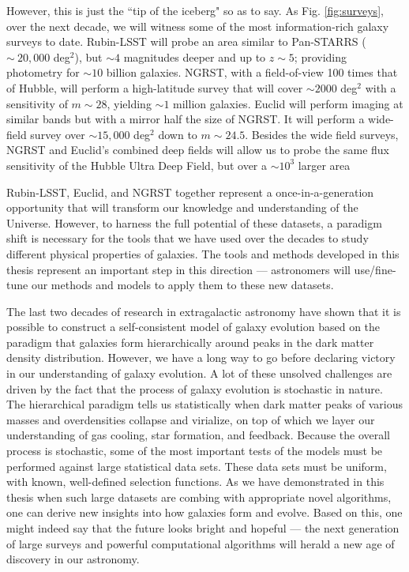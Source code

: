However, this is just the ``tip of the iceberg" so as to say. As Fig. \ref{fig:surveys}, over the next decade, we will witness some of the most information-rich galaxy surveys to date. Rubin-LSST will probe an area similar to Pan-STARRS ($\sim~20,000$ deg$^2$), but $\sim4$ magnitudes deeper and up to $z\sim5$; providing photometry for $\sim10$ billion galaxies. NGRST, with a field-of-view 100 times that of Hubble, will perform a high-latitude survey that will cover $\sim2000$ deg$^2$ with a sensitivity of $m\sim28$, yielding $\sim1$ million galaxies. Euclid will perform imaging at similar bands but with a mirror half the size of NGRST. It will perform a wide-field survey over $\sim15,000$ deg$^2$ down to $m\sim24.5$. Besides the wide field surveys, NGRST and Euclid’s combined deep fields will allow us to probe the same flux sensitivity of the Hubble Ultra Deep Field, but over a $\sim10^3$ larger area 

Rubin-LSST, Euclid, and NGRST together represent a once-in-a-generation opportunity that will transform our knowledge and understanding of the Universe. However, to harness the full potential of these datasets, a paradigm shift is necessary for the tools that we have used over the decades to study different physical properties of galaxies. The tools and methods developed in this thesis represent an important step in this direction --- astronomers will use/fine-tune our methods and models to apply them to these new datasets. 

 The last two decades of research in extragalactic astronomy have shown that it is possible to construct a self-consistent model of galaxy evolution based on the paradigm that galaxies form hierarchically around peaks in the dark matter density distribution. However, we have a long way to go before declaring victory in our understanding of galaxy evolution. A lot of these unsolved challenges are driven by the fact that the process of galaxy evolution is stochastic in nature. The hierarchical paradigm tells us statistically when dark matter peaks of various masses and overdensities collapse and virialize, on top of which we layer our understanding of gas cooling, star formation, and feedback. Because the overall process is stochastic, some of the most important tests of the models must be performed against large statistical data sets. These data sets must be uniform, with known, well-defined selection functions. As we have demonstrated in this thesis when such large datasets are combing with appropriate novel algorithms, one can derive new insights into how galaxies form and evolve. Based on this, one might indeed say that the future looks bright and hopeful --- the next generation of large surveys and powerful computational algorithms will herald a new age of discovery in our astronomy. 


